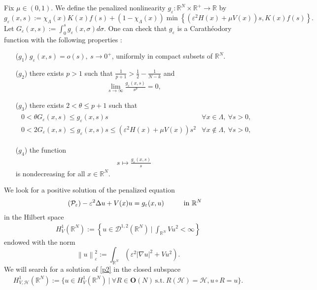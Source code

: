 \documentclass[a4paper]{amsart}
\begin{document}
Fix $\mu \in (0,1)$. We define the penalized nonlinearity $g_{\varepsilon}: {\mathbb{R}}^N \times {\mathbb{R}}^+ \rightarrow {\mathbb{R}}$ by
\[
  g_{\varepsilon}(x,s) := \chi_{\Lambda}(x) K(x) f(s) + \left( 1-\chi_{\Lambda}(x) \right) \min\left\lbrace  \left(
\varepsilon^2 H(x)+\mu V(x)\right) s, K(x)f(s) \right\rbrace.
\]
Let $G_{\varepsilon}(x,s) := \int_0^s g_{\varepsilon}(x,\sigma) d\sigma$. One can check that $g_{\varepsilon}$ is a
Carath\'eodory
function with the following properties :
\begin{itemize}
 \item[($g_1$)] $g_{\varepsilon}(x,s) = o(s),\ s \rightarrow 0^+$, uniformly in compact subsets of ${\mathbb{R}}^N$.
 \item[($g_2$)] there exists $p>1$ such that $\frac{1}{p+1} > \frac{1}{2} - \frac{1}{N-k}$ and 
 \begin{align*}
  \lim_{s \rightarrow \infty} \frac{g_{\varepsilon}(x,s)}{s^p} = 0,
 \end{align*}
 \item[($g_3$)] there exists $2 < \theta \leq p+1$ such that
 \begin{align*}
 \begin{array}{ll}
  0 < \theta G_{\varepsilon}(x,s) \leq g_{\varepsilon}(x,s)s &\forall x \in \Lambda,\ \forall s>0, \\
  0 < 2 G_{\varepsilon}(x,s) \leq g_{\varepsilon}(x,s)s \leq \left( \varepsilon^2 H(x)+\mu V(x)\right) s^2 &\forall x \notin
\Lambda,\ \forall s>0,
 \end{array}
 \end{align*}
 \item[($g_4$)] the function
 \begin{align*}
 s \mapsto \frac{g_{\varepsilon}(x,s)}{s}
 \end{align*}
 is nondecreasing for all $x \in {\mathbb{R}}^N$.
\end{itemize}

\bigskip

We look for a positive solution of the penalized equation
\begin{align}\label{p2}\tag{$\mathcal{P}_{\varepsilon}$}
	 - \varepsilon^2 \Delta u + V(x)u = g_{\varepsilon}(x,u) \hspace{1cm} \textnormal{in} \ {\mathbb{R}}^N
\end{align}
in the Hilbert space
\begin{align*}
 H^1_{V}({\mathbb{R}}^N) := \left\{ u \in \mathcal{D}^{1,2}({\mathbb{R}}^N)\ \vert\ \int_{{\mathbb{R}}^N} V u^2 < \infty \right\}
\end{align*}
endowed with the norm
\begin{equation}
\label{eqNorm}
 {\left\| {u} \right\|}_{\varepsilon}^2 := \int_{{\mathbb{R}}^N} \left( \varepsilon^2 {\left| {\nabla u} \right|}^2 + V u^2 \right).
\end{equation}
We will search for a solution of \eqref{p2} in the closed subspace
\begin{multline}\label{def:spaceH}
 H^1_{V,\mathcal{H}}({\mathbb{R}}^N) := \bigl\{ u \in H^1_{V}({\mathbb{R}}^N)\ \vert\ \forall R \in \mathbf{O}(N) \ \text{s.t.}\
R({\mathcal{H}}) = {\mathcal{H}},
 u \circ R = u \bigr\}.
\end{multline}
\end{document}
